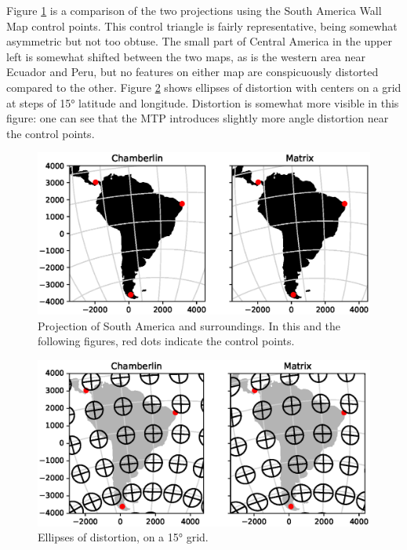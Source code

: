 \documentclass[]{interact}
\begin{document}
Figure \ref{fig:proj} is a comparison of the two projections using the South
America Wall Map control points. This control triangle is fairly representative,
being somewhat asymmetric but not too obtuse. The small part of Central America
in the upper left is somewhat shifted between the two maps, as is the western
area near Ecuador and Peru, but no features on either map are conspicuously
distorted compared to the other. Figure \ref{fig:tissot} shows ellipses of
distortion with centers on a grid at steps of 15° latitude and longitude.
Distortion is somewhat more visible in this figure: one can see that the
MTP introduces slightly more angle distortion near the control points.

\begin{figure}
  \includegraphics[width=\textwidth]{South_America_Wall_Map_zoom}
  \caption{Projection of South America and surroundings. In this and the
  following figures, red dots indicate the control points.}
  \label{fig:proj}
\end{figure}

\begin{figure}
  \includegraphics[width=\textwidth]{South_America_Wall_Map_tissot}
  \caption{Ellipses of distortion, on a 15° grid.}
  \label{fig:tissot}
\end{figure}
\end{document}
